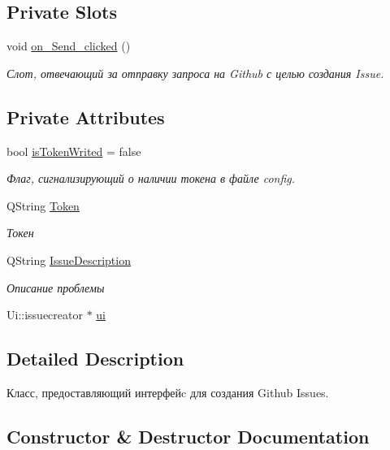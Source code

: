 \subsection*{Private Slots}
\begin{DoxyCompactItemize}
\item 
void \hyperlink{classissuecreator_a03af040ad19d02a8c271fe0c7b40d160}{on\+\_\+\+Send\+\_\+clicked} ()
\begin{DoxyCompactList}\small\item\em Слот, отвечающий за отправку запроса на Github с целью создания Issue. \end{DoxyCompactList}\end{DoxyCompactItemize}
\subsection*{Private Attributes}
\begin{DoxyCompactItemize}
\item 
bool \hyperlink{classissuecreator_ab95a97a1a87dae8170bfaf0c95859413}{is\+Token\+Writed} = false
\begin{DoxyCompactList}\small\item\em Флаг, сигнализирующий о наличии токена в файле config. \end{DoxyCompactList}\item 
Q\+String \hyperlink{classissuecreator_ad8f87f64c334987f0316a3d3191d55c8}{Token}
\begin{DoxyCompactList}\small\item\em Токен \end{DoxyCompactList}\item 
Q\+String \hyperlink{classissuecreator_a7d6bc72a5a8ddafa35e3d0e759918586}{Issue\+Description}
\begin{DoxyCompactList}\small\item\em Описание проблемы \end{DoxyCompactList}\item 
Ui\+::issuecreator $\ast$ \hyperlink{classissuecreator_ae85db2bae308918495f313ac058b006b}{ui}
\end{DoxyCompactItemize}


\subsection{Detailed Description}
Класс, предоставляющий интерфейc для создания Github Issues. 

\subsection{Constructor \& Destructor Documentation}
\mbox{\label{classissuecreator_af18020b34fc69c9ffea22e7f748b8f96}} 
